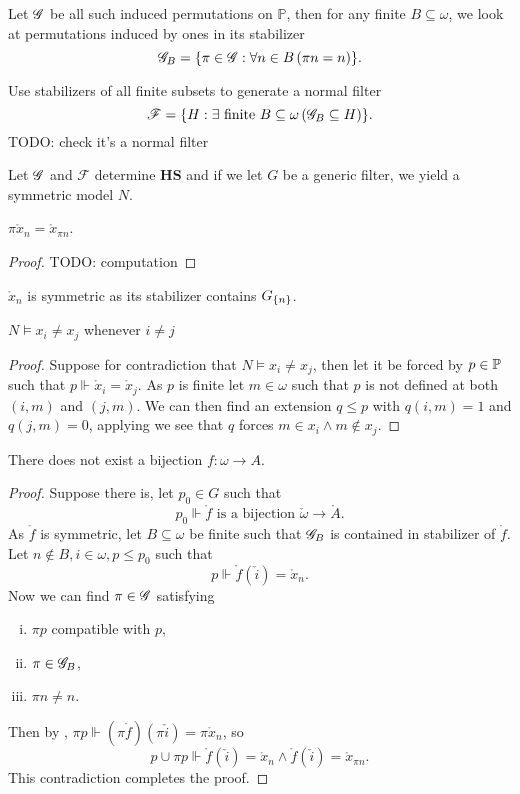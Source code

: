 Let \(\G\) be all such induced permutations on \(\mathbb{P}\), then for any finite \(B\subseteq \omega\),
we look at permutations induced by ones in its stabilizer
\[ \G_B = \set{ \pi\in \G: \forall n\in B\left( \pi n = n \right) }. \]

Use stabilizers of all finite subsets to generate a normal filter
\[ \mathscr{F} = \set{H: \exists \text{ finite } B\subseteq \omega \left(\G_B \subseteq H\right) }. \]
TODO: check it's a normal filter

Let \(\G\) and \(\mathscr{F}\) determine \(\mathbf{HS}\) and if we let \(G\) be a generic filter, we yield a symmetric model \(N\).

\begin{lemma}
    \(\pi \mathring{x}_n = \mathring{x}_{\pi n} \).
\end{lemma}
\begin{proof}
    TODO: computation
\end{proof}
\begin{corollary}
    \(\mathring{x}_n\) is symmetric as its stabilizer contains \(G_\set{n}\).
\end{corollary}

\begin{lemma}
    \(N\models x_i\ne x_j\) whenever \(i\ne j\)
\end{lemma}
\begin{proof}
    Suppose for contradiction that \(N\models x_i\ne x_j\),
    then let it be forced by \(p\in \P\) such that \(p\Vdash \mathring{x}_i = \mathring{x}_j\).
    As \(p\) is finite let \(m\in\omega\) such that \(p\) is not defined at both \((i,m)\) and \((j,m)\).
    We can then find an extension \(q\leq p\) with \(q(i,m) = 1\) and \(q(j,m) = 0\),
    applying 
    we see that \(q\) forces \(m\in x_i \land m\notin x_j\).
\end{proof}

\begin{lemma}
    There does not exist a bijection \(f:\omega\to A\).
\end{lemma}
\begin{proof}
Suppose there is, let \(p_0 \in G\) such that \[p_0\Vdash \mathring{f} \text{ is a bijection } \check{\omega}\to\mathring{A}. \]
As \(\mathring{f}\) is symmetric, let \(B\subseteq \omega\) be finite such that \(\G_B\) is contained in stabilizer of \(\mathring{f}\).
Let \(n\notin B, i\in\omega, p\leq p_0\) such that \[p\Vdash \mathring{f}(\check{i}) = \mathring{x}_n.\]
Now we can find \(\pi\in\G\) satisfying
\begin{enumerate}[i.]
    \item \(\pi p\) compatible with \(p\),
    \item \(\pi \in \G_B\),
    \item \(\pi n\ne n\).
\end{enumerate}
Then by , \(\pi p \Vdash (\pi \mathring{f})(\pi \check{i}) = \pi \mathring{x}_{n}\), so
\[p \cup \pi p \Vdash \mathring{f}(\check{i}) = \mathring{x}_n \land \mathring{f}(\check{i}) = \mathring{x}_{\pi n}. \]
This contradiction completes the proof.
\end{proof}

